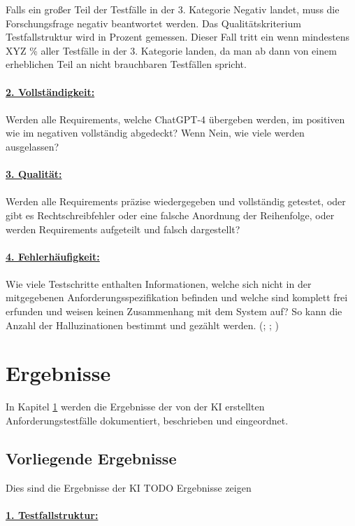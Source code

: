 \documentclass[12pt,toc=bib,toc=listof]{scrreprt}
\begin{document}
\noindent Falls ein großer Teil der Testfälle in der 3. Kategorie Negativ landet, muss die Forschungsfrage negativ beantwortet werden. Das Qualitätskriterium Testfallstruktur wird in Prozent gemessen. Dieser Fall tritt ein wenn mindestens XYZ \% aller Testfälle in der 3. Kategorie landen, da man ab dann von einem erheblichen Teil an nicht brauchbaren Testfällen spricht.\\
\\
\textbf{\underline{2. Vollständigkeit:}}\\
\\
Werden alle Requirements, welche ChatGPT-4 übergeben werden, im positiven wie im negativen vollständig abgedeckt? Wenn Nein, wie viele werden ausgelassen?\\
\\
\textbf{\underline{3. Qualität:}}\\
\\
Werden alle Requirements präzise wiedergegeben und vollständig getestet, oder gibt es Rechtschreibfehler oder eine falsche Anordnung der Reihenfolge, oder werden Requirements aufgeteilt und falsch dargestellt?\\
\\
\textbf{\underline{4. Fehlerhäufigkeit:}}\\
\\
Wie viele Testschritte enthalten Informationen, welche sich nicht in der mitgegebenen Anforderungsspezifikation befinden und welche sind komplett frei erfunden und weisen keinen Zusammenhang mit dem System auf? So kann die Anzahl der Halluzinationen bestimmt und gezählt werden. (\cite{Aysolmaz2018}; \cite{Barmi2011}; \cite{Mustafa2021})

\chapter{Ergebnisse} %
\label{sec:ergebnisse}
In Kapitel \ref{sec:ergebnisse} werden die Ergebnisse der von der KI erstellten Anforderungstestfälle dokumentiert, beschrieben und eingeordnet.

\section{Vorliegende Ergebnisse} %
\label{sec:vorliegendeErgebnisse}
Dies sind die Ergebnisse der KI
TODO Ergebnisse zeigen\\
\\\textbf{\underline{1. Testfallstruktur:}}\\
\end{document}

